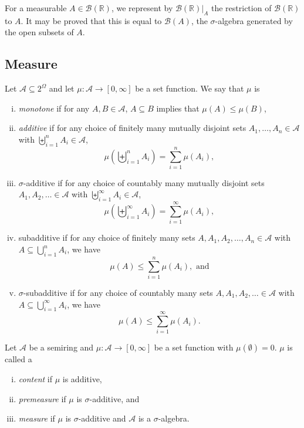 \vspace{2mm}
For a measurable $A\in\mathcal{B}(\mathbb{R})$, we represent by $\left.\mathcal{B}(\mathbb{R})\right|_{A}$ the restriction of $\mathcal{B}(\mathbb{R})$ to $A$. It may be proved that this is equal to $\mathcal{B}(A)$, the $\sigma$-algebra generated by the open subsets of $A$.

\subsection{Measure}

\begin{definition}
    Let $\mathcal{A}\subseteq2^\Omega$ and let $\mu:\mathcal{A}\to[0,\infty]$ be a set function. We say that $\mu$ is
    \begin{enumerate}[(i)]
        \item \textit{monotone} if for any $A,B\in\mathcal{A}$, $A\subseteq B$ implies that $\mu(A)\leq\mu(B)$,
        
        \item \textit{additive} if for any choice of finitely many mutually disjoint sets $A_1,\ldots,A_n\in\mathcal{A}$ with $\biguplus_{i=1}^n A_i\in\mathcal{A}$,
        $$\mu\left(\biguplus_{i=1}^nA_i\right)=\sum_{i=1}^n\mu(A_i),$$
        
        \item $\sigma$-additive if for any choice of countably many mutually disjoint sets $A_1,A_2,\ldots\in\mathcal{A}$ with $\biguplus_{i=1}^\infty A_i\in\mathcal{A}$,
        $$\mu\left(\biguplus_{i=1}^\infty A_i\right)=\sum_{i=1}^\infty\mu(A_i),$$
        
        \item subadditive if for any choice of finitely many sets $A,A_1,A_2,\ldots,A_n\in\mathcal{A}$ with $A\subseteq\bigcup_{i=1}^nA_i$, we have $$\mu(A)\leq\sum_{i=1}^n\mu(A_i),\text{ and}$$
        
        \item $\sigma$-subadditive if for any choice of countably many sets $A,A_1,A_2,\ldots\in\mathcal{A}$ with $A\subseteq\bigcup_{i=1}^\infty A_i$, we have
        $$\mu(A)\leq\sum_{i=1}^\infty \mu(A_i).$$
    \end{enumerate}
\end{definition}

\begin{definition}
\label{measureDef}
    Let $\mathcal{A}$ be a semiring and $\mu:\mathcal{A}\to[0,\infty]$ be a set function with $\mu(\emptyset)=0$. $\mu$ is called a
    \begin{enumerate}[(i)]
        \item \textit{content} if $\mu$ is additive,
        \item \textit{premeasure} if $\mu$ is $\sigma$-additive, and
        \item \textit{measure} if $\mu$ is $\sigma$-additive and $\mathcal{A}$ is a $\sigma$-algebra.
    \end{enumerate}
\end{definition}

